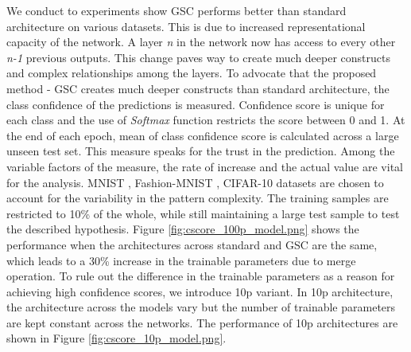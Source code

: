 \documentclass{article}
\begin{document}
We conduct to experiments show GSC performs better than standard architecture on various datasets. This is due to increased representational capacity of the network. A layer \emph{n} in the network now has access to every other \emph{n-1} previous outputs. This change paves way to create much deeper constructs and complex relationships among the layers. To advocate that the proposed method - GSC creates much deeper constructs than standard architecture, the class confidence of the predictions is measured. Confidence score is unique for each class and the use of \emph{Softmax} function restricts the score between 0 and 1. At the end of each epoch, mean of class confidence score is calculated across a large unseen test set. This measure speaks for the trust in the prediction. Among the variable factors of the measure, the rate of increase and the actual value are vital for the analysis. MNIST \cite{LeCun1998GradientbasedLA}, Fashion-MNIST \cite{Xiao2017FashionMNISTAN}, CIFAR-10 datasets \cite{Krizhevsky2009LearningML} are chosen to account for the variability in the pattern complexity. The training samples are restricted to 10\% of the whole, while still maintaining a large test sample to test the described hypothesis. Figure \ref{fig:cscore_100p_model.png} shows the performance when the architectures across standard and GSC are the same, which leads to a 30\% increase in the trainable parameters due to merge operation. To rule out the difference in the trainable parameters as a reason for achieving high confidence scores, we introduce 10p variant. In 10p architecture, the architecture across the models vary but the number of trainable parameters are kept constant across the networks. The performance of 10p architectures are shown in Figure \ref{fig:cscore_10p_model.png}.  

\end{document}
